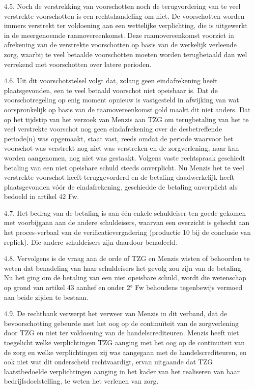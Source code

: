 \documentclass[
  dutch,
  a4paper,
]{article}
\begin{document}
4.5. Noch de verstrekking van voorschotten noch de terugvordering van te veel verstrekte voorschotten is een rechtshandeling om niet. De voorschotten worden immers verstrekt ter voldoening aan een wettelijke verplichting, die is uitgewerkt in de meergenoemde raamovereenkomst. Deze raamovereenkomst voorziet in afrekening van de verstrekte voorschotten op basis van de werkelijk verleende zorg, waarbij te veel betaalde voorschotten moeten worden terugbetaald dan wel verrekend met voorschotten over latere perioden.

4.6. Uit dit voorschotstelsel volgt dat, zolang geen eindafrekening heeft plaatsgevonden, een te veel betaald voorschot niet opeisbaar is. Dat de voorschotregeling op enig moment opnieuw is vastgesteld in afwijking van wat oorspronkelijk op basis van de raamovereenkomst gold maakt dit niet anders. Dat op het tijdstip van het verzoek van Menzis aan TZG om terugbetaling van het te veel verstrekte voorschot nog geen eindafrekening over de desbetreffende periode(n) was opgemaakt, staat vast, reeds omdat de periode waarvoor het voorschot was verstrekt nog niet was verstreken en de zorgverlening, naar kan worden aangenomen, nog niet was gestaakt. Volgens vaste rechtspraak geschiedt betaling van een niet opeisbare schuld steeds onverplicht. Nu Menzis het te veel verstrekte voorschot heeft teruggevorderd en de betaling daadwerkelijk heeft plaatsgevonden vóór de eindafrekening, geschiedde de betaling onverplicht als bedoeld in artikel 42 Fw.

4.7. Het bedrag van de betaling is aan één enkele schuldeiser ten goede gekomen met voorbijgaan aan de andere schuldeisers, waarvan een overzicht is gehecht aan het proces-verbaal van de verificatievergadering (productie 10 bij de conclusie van repliek). Die andere schuldeisers zijn daardoor benadeeld.

4.8. Vervolgens is de vraag aan de orde of TZG en Menzis wisten of behoorden te weten dat benadeling van haar schuldeisers het gevolg zou zijn van de betaling. Nu het ging om de betaling van een niet opeisbare schuld, wordt die wetenschap op grond van artikel 43 aanhef en onder 2° Fw behoudens tegenbewijs vermoed aan beide zijden te bestaan.

4.9. De rechtbank verwerpt het verweer van Menzis in dit verband, dat de bevoorschotting gebeurde met het oog op de continuïteit van de zorgverlening door TZG en niet ter voldoening van de handelscrediteuren. Menzis heeft niet toegelicht welke verplichtingen TZG aanging met het oog op de continuïteit van de zorg en welke verplichtingen zij was aangegaan met de handelscrediteuren, en ook niet wat dit onderscheid rechtvaardigt, ervan uitgaande dat TZG laatstbedoelde verplichtingen aanging in het kader van het realiseren van haar bedrijfsdoelstelling, te weten het verlenen van zorg.
\end{document}
